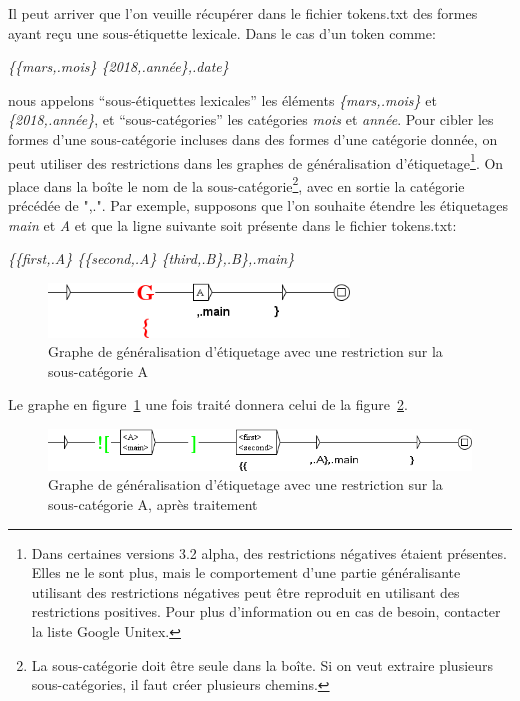 Il peut arriver que l'on veuille récupérer dans le fichier tokens.txt des formes ayant reçu une
sous-étiquette lexicale. Dans le cas d'un token comme:

\bigskip
\emph{\{\{mars,.mois\} \{2018,.année\},.date\}}

\bigskip
\noindent nous appelons ``sous-étiquettes lexicales'' les éléments
\emph{\{mars,.mois\}} et \emph{\{2018,.année\}}, et ``sous-catégories''
les catégories \textit{mois} et \textit{année}.
Pour cibler les formes d'une sous-catégorie incluses dans des formes d'une catégorie donnée,
on peut utiliser des restrictions dans les graphes de généralisation d'étiquetage\footnote{Dans
certaines versions 3.2 alpha, des restrictions négatives étaient présentes. Elles ne le sont plus,
mais le comportement d'une partie généralisante utilisant des restrictions négatives
peut être reproduit en utilisant des restrictions positives. Pour plus d'information ou
en cas de besoin, contacter la liste Google Unitex.}. On place dans la boîte le nom
de la sous-catégorie\footnote{ La sous-catégorie doit être seule dans la boîte.
Si on veut extraire plusieurs sous-catégories, il faut créer plusieurs chemins.},
avec en sortie la catégorie précédée de ",.".
Par exemple, supposons que l'on souhaite étendre les étiquetages
\textit{main} et \textit{A} et que la ligne suivante soit présente dans le fichier tokens.txt:

\bigskip
\emph{\{\{first,.A\} \{\{second,.A\} \{third,.B\},.B\},.main\}}

\bigskip
\begin{figure}[!htb]
  \centering
  \includegraphics[width=8cm]{resources/img/graphe_restriction_A.png}
  \caption{Graphe de généralisation d'étiquetage avec une restriction sur la sous-catégorie A}
  \label{fig:graphe_restriction_A}
\end{figure}

\bigskip
\noindent Le graphe en figure~\ref{fig:graphe_restriction_A} une fois traité donnera
celui de la figure~\ref{fig:graphe_restriction_A_genere}.

\begin{figure}[!htb]
  \centering
  \includegraphics[width=14cm]{resources/img/graphe_restriction_A_genere.png}
  \caption{Graphe de généralisation d'étiquetage avec une restriction sur la sous-catégorie A,
  après traitement}
  \label{fig:graphe_restriction_A_genere}
\end{figure}

